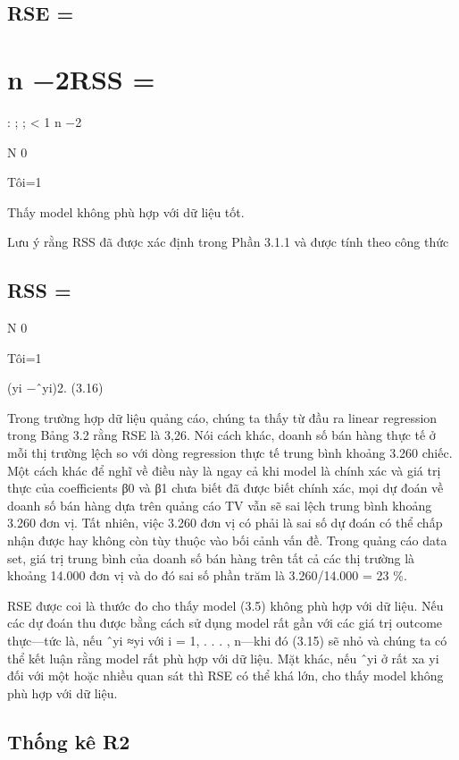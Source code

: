 \subsection{RSE =}

\section{n −2RSS =}

: ; ; < 1 n −2

N 0

Tôi=1

Thấy model không phù hợp với dữ liệu tốt.

Lưu ý rằng RSS đã được xác định trong Phần 3.1.1 và được tính theo công thức

\subsection{RSS =}

N 0

Tôi=1

(yi −ˆyi)2. (3.16)

Trong trường hợp dữ liệu quảng cáo, chúng ta thấy từ đầu ra linear regression trong Bảng 3.2 rằng RSE là 3,26. Nói cách khác, doanh số bán hàng thực tế ở mỗi thị trường lệch so với dòng regression thực tế trung bình khoảng 3.260 chiếc. Một cách khác để nghĩ về điều này là ngay cả khi model là chính xác và giá trị thực của coefficients β0 và β1 chưa biết đã được biết chính xác, mọi dự đoán về doanh số bán hàng dựa trên quảng cáo TV vẫn sẽ sai lệch trung bình khoảng 3.260 đơn vị. Tất nhiên, việc 3.260 đơn vị có phải là sai số dự đoán có thể chấp nhận được hay không còn tùy thuộc vào bối cảnh vấn đề. Trong quảng cáo data set, giá trị trung bình của doanh số bán hàng trên tất cả các thị trường là khoảng 14.000 đơn vị và do đó sai số phần trăm là 3.260/14.000 = 23 \%.

RSE được coi là thước đo cho thấy model (3.5) không phù hợp với dữ liệu. Nếu các dự đoán thu được bằng cách sử dụng model rất gần với các giá trị outcome thực—tức là, nếu ˆyi ≈yi với i = 1, . . . , n—khi đó (3.15) sẽ nhỏ và chúng ta có thể kết luận rằng model rất phù hợp với dữ liệu. Mặt khác, nếu ˆyi ở rất xa yi đối với một hoặc nhiều quan sát thì RSE có thể khá lớn, cho thấy model không phù hợp với dữ liệu.

\subsection{Thống kê R2}

